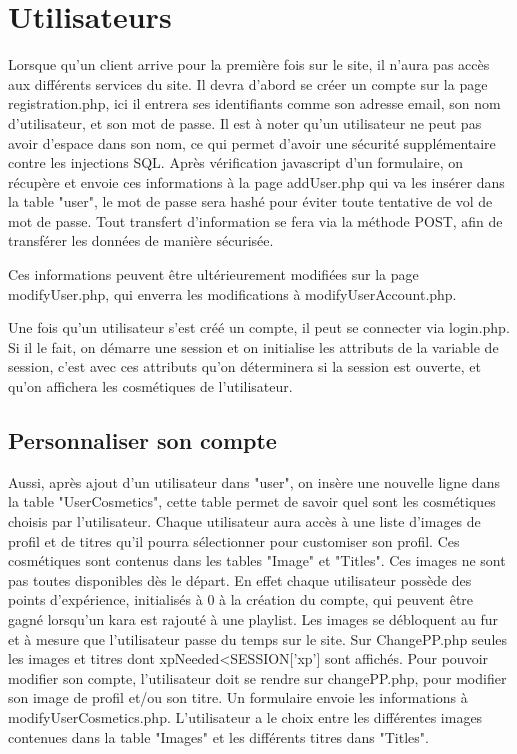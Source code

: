 \section{Utilisateurs}

Lorsque qu'un client arrive pour la première fois sur le site, il n'aura pas accès aux différents services du site. Il devra d'abord se créer un compte sur la page registration.php, ici il entrera ses 
identifiants comme son adresse email, son nom d'utilisateur, et son mot de passe.\newline
Il est à noter qu'un utilisateur ne peut pas avoir d'espace dans son nom, ce qui permet d'avoir une sécurité supplémentaire contre les injections SQL.\newline
Après vérification javascript d'un formulaire, on récupère et envoie ces informations à la page addUser.php qui va les insérer dans la table "user", le mot de passe sera hashé pour éviter toute tentative de vol de mot de passe. Tout transfert d'information se fera via la méthode POST, afin de transférer les données de manière sécurisée.
\newline

Ces informations peuvent être  ultérieurement modifiées sur la page modifyUser.php, qui enverra les modifications à modifyUserAccount.php.\newline

Une fois qu'un utilisateur s'est créé un compte, il peut se connecter via login.php. Si il le fait, on démarre une session et on initialise les attributs de la variable de session, c'est avec ces attributs qu'on déterminera si la session est ouverte, et qu'on affichera les cosmétiques de l'utilisateur.

\subsection{Personnaliser son compte}

Aussi, après ajout d'un utilisateur dans "user", on insère une nouvelle ligne dans la table "UserCosmetics", cette table permet de savoir quel sont les cosmétiques choisis par l'utilisateur.  
Chaque utilisateur aura accès à une liste d'images de profil et de titres qu'il pourra sélectionner pour customiser son profil. Ces cosmétiques sont contenus dans les tables "Image" et "Titles".
\newline
Ces images ne sont pas toutes disponibles dès le départ. En effet chaque utilisateur possède des points d'expérience, initialisés à 0 à la création du compte, qui peuvent être gagné lorsqu'un kara est rajouté à une playlist. Les images se débloquent au fur et à mesure que l'utilisateur passe du temps sur le site. Sur ChangePP.php seules les images et titres dont xpNeeded<SESSION['xp'] sont affichés.\newline
Pour pouvoir modifier son compte, l'utilisateur doit se rendre sur changePP.php, pour modifier son image de profil et/ou son titre. Un formulaire envoie les informations à modifyUserCosmetics.php. L'utilisateur a le choix entre les différentes images contenues dans la table "Images" et les différents titres dans "Titles". \newline

